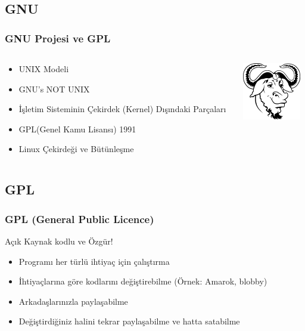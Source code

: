 \documentclass{beamer}
\begin{document}
	\subsection{GNU}
		\begin{frame}
		 	\frametitle{GNU Projesi ve GPL}
			\begin{columns}
			\begin{column}[l]{5cm}
				\begin{itemize}[<+->]
					\item UNIX Modeli
					\item GNU's NOT UNIX
					\item İşletim Sisteminin Çekirdek (Kernel) Dışındaki Parçaları
					\item GPL(Genel Kamu Lisansı) 1991
					\item Linux Çekirdeği ve Bütünleşme
				\end{itemize}
			\end{column}
			\begin{column}[r]{5cm}		
				\includegraphics{img/gnukucuk.jpg}
			\end{column}
			\end{columns}


		\end{frame}
	\subsection{GPL}
		\begin{frame}
		 	\frametitle{GPL (General Public Licence)}
			Açık Kaynak kodlu ve Özgür!
			\begin{itemize}
			 \item Programı her türlü ihtiyaç için çalıştırma
			 \item İhtiyaçlarına göre kodlarını değiştirebilme (Örnek: Amarok, blobby)
			 \item Arkadaşlarınızla paylaşabilme
			 \item Değiştirdiğiniz halini tekrar paylaşabilme ve hatta satabilme
			\end{itemize}

		\end{frame}
\end{document}
